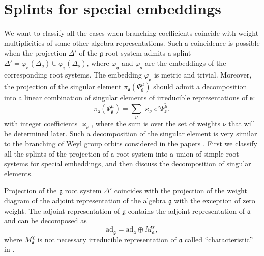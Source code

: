 \documentclass[12pt]{iopart}
\newcommand{\pia}{\pi_{\mathfrak{a}}}
\newcommand{\gf}{\mathfrak{g}}
\newcommand{\af}{\mathfrak{a}}
\newcommand{\sfr}{\mathfrak{s}}
\begin{document}

\section{Splints for special embeddings}
\label{sec:splints-spec-embedd}


We want to classify all the cases when branching coefficients coincide with weight multiplicities of
some other algebra representations. Such a coincidence is possible when the projection $\Delta'$ of
the $\gf$ root system admits a splint $\Delta'=\varphi_{\af}(\Delta_{\af})\cup
\varphi_{\sfr}(\Delta_{\sfr})$, where $\varphi_{\af}$ and $\varphi_{\sfr}$ are the embeddings of
the corresponding root systems. The embedding $\varphi_{\af}$ is metric and trivial. Moreover, the
projection of the singular element $\pia\left(\Psi^{\mu}_{\gf}\right)$ should admit a decomposition into
a linear combination of singular elements of irreducible representations of $\sfr$:
\begin{equation}
  \label{eq:4}
  \pia\left(\Psi^{\mu}_{\gf}\right)=\sum_{\nu} \varkappa_{\nu}e^{\nu}\Psi^{\tilde\mu}_{\sfr},
\end{equation}
with integer coefficients $\varkappa_{\nu}$, where the sum is over the set of weights $\nu$ that
will be determined later. Such a decomposition of the singular element is very similar to the branching of Weyl group orbits considered in the papers \cite{larouche2011branching,larouche2009branching}. First we classify all the splints of the projection of a root system into
a union of simple root systems for special embeddings, and then discuss the decomposition of singular
elements.

Projection of the $\gf$ root system $\Delta'$ coincides with the projection of the weight diagram of the
adjoint representation of the algebra $\gf$ with the exception of zero weight. The adjoint representation of
$\gf$ contains the adjoint representation of $\af$ and can be decomposed as
\begin{equation}
  \label{eq:3}
  \mathrm{ad}_{\gf}=\mathrm{ad}_{\af}\oplus M_{\af}^{\chi},
\end{equation}
where $M^{\chi}_{\af}$ is not necessary irreducible representation of $\af$ called
``characteristic'' in \cite{dynkin1952semisimple}. 
\end{document}
